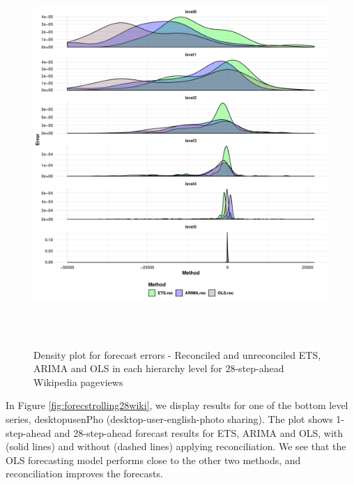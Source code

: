 \documentclass[11pt,a4paper,]{article}
\begin{document}
\begin{figure}

{\centering \includegraphics[width=450px,height=550px]{Paper-Figures/results_Wikipedia/densityplot_28} 

}

\caption{Density plot for forecast errors -  Reconciled and unreconciled ETS, ARIMA and OLS in each hierarchy level for 28-step-ahead Wikipedia pageviews}\label{fig:densityplotwiki}
\end{figure}

In Figure \ref{fig:forecstrolling28wiki}, we display results for one of
the bottom level series, desktopusenPho (desktop-user-english-photo
sharing). The plot shows 1-step-ahead and 28-step-ahead forecast results
for ETS, ARIMA and OLS, with (solid lines) and without (dashed lines)
applying reconciliation. We see that the OLS forecasting model performs
close to the other two methods, and reconciliation improves the
forecasts.
\end{document}

